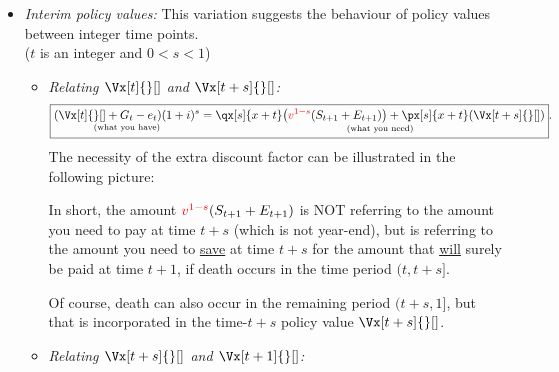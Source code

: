 \begin{enumerate}
\begin{itemize}
\item \emph{Interim policy values:} This variation suggests the behaviour of
policy values between integer time points. \\
(\(t\) is an integer and \(0< s< 1\))
\begin{itemize}
\item \emph{Relating \(\Vx[t]{}[]\) and \(\Vx[t+s]{}[]\):}
\[
\boxed{
\underset{\text{(what you have)}}{(\Vx[t]{}[]+G_t-e_t)(1+i)^{s}}
=\underset{\text{(what you need)}}{\qx[s]{x+t}\qty(\rc{v^{1-s}}(S_{t+1}+E_{t+1}))
+\px[s]{x+t}(\Vx[t+s]{}[])}}.
\]
The necessity of the extra discount factor  can be illustrated
in the following picture:
\begin{center}
\end{center}
In short, the amount \({\color{red}v^{1-s}}(S_{t+1}+E_{t+1})\) is NOT referring to the
amount you need to pay at time \(t+s\) (which is not year-end), but is
referring to the amount you need to \underline{save} at time \(t+s\)
for the amount that \underline{will} surely be paid at time \(t+1\),
if death  occurs in the time period \((t,t+s]\).
\begin{note}
Of course, death  can also occur in the remaining period
\((t+s,1]\), but that is incorporated in the time-\(t+s\) policy value
\(\Vx[t+s]{}[]\).
\end{note}
\item \emph{Relating \(\Vx[t+s]{}[]\) and \(\Vx[t+1]{}[]\):}

\end{itemize}
\end{itemize}
\end{enumerate}
